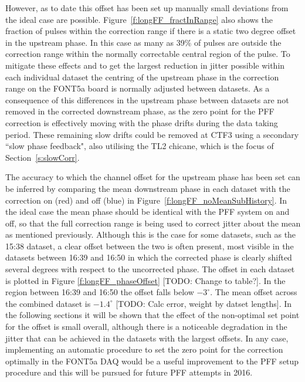 However, as to date this offset has been set up manually small deviations from the ideal 
case are possible. Figure~\ref{f:longFF_fractInRange} also shows the fraction of pulses 
within the correction range if there is a static two degree offset in the upstream 
phase. In this case as many as 39\% of pulses are outside the correction range within 
the normally correctable central region of the pulse. To mitigate these effects and to 
get the largest reduction in jitter possible within each individual dataset 
the centring of the upstream phase in the correction range on the FONT5a board is normally adjusted 
between datasets. As a consequence of this differences in the upstream phase between 
datasets are not removed in the corrected downstream phase, as the zero point for the 
PFF correction is effectively moving with the phase drifts during the data taking 
period. These remaining slow drifts could be removed at CTF3 using a secondary ``slow 
phase feedback", also utilising the TL2 chicane, which is the focus of Section~\ref{s:slowCorr}.


The accuracy to which the channel offset for the upstream phase has been set can be 
inferred by comparing the mean downstream phase in each dataset with the correction on 
(red) and off (blue) in Figure~\ref{f:longFF_noMeanSubHistory}. In the ideal case the 
mean phase should be identical with the PFF system on and off, so that the full 
correction range is being used to correct jitter about the mean as mentioned previously. 
Although this is the case for some datasets, such as the 15:38 dataset, a clear offset 
between the two is often present, most visible in the datasets between 16:39 and 16:50 
in which the corrected phase is clearly shifted several degrees with respect to the 
uncorrected phase. The offset in each dataset is plotted in Figure 
\ref{f:longFF_phaseOffset} [TODO: Change to table?]. In the region between 16:39 and 
16:50 the offset falls below \(-3^\circ\). The mean offset across the combined dataset 
is \(-1.4^\circ\) [TODO: Calc error, weight by datset lengths]. In the following 
sections it will be shown that the effect of the non-optimal set point for the offset is small overall, 
although there is a noticeable degradation in the jitter that can be 
achieved in the datasets with the largest offsets. In any case, implementing an 
automatic procedure to set the zero point for the correction optimally in the FONT5a DAQ 
would be a useful improvement to the PFF setup procedure and this will be pursued for 
future PFF attempts in 2016.



